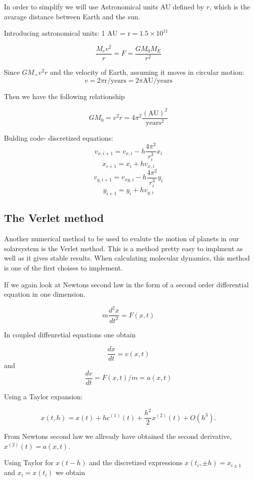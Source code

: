 \documentclass[../main.tex]{subfiles}
\begin{document}
In order to simplify we will use Astronomical units AU defined by $r$, which is the avarage distance between Earth and the sun.

Introducing astronomical units: 1 $\text{AU = r} = 1.5 \times 10^{11}$

\begin{equation}
  \frac{M_ev^2}{r} = F = \frac{GM_0M_E}{r^2}
\end{equation}

Since $GM_=  v^2r$ and the velocity of Earth, assuming it moves in circular motion: $$v = 2\pi \text{r/years}= 2\pi \text{AU/years}$$

Then we have the following relationship

$$GM_0 = v^2r = 4\pi^2 \frac{(\text{AU})^2}{\text{years}^2}$$

Bulding code- discretized equations:
$$v_{x,i+1} = v_{x,i} - h \frac{4\pi^2}{r_i^3}x_i$$
$$x_{i+1} = x_{i} + hv_{x,i}$$
$$v_{y,i+1} = v_{xy,i} - h \frac{4\pi^2}{r_i^3}y_i$$
$$y_{i+1} = y_{i} + hv_{y,i}$$

\subsection{The Verlet method}
Another numerical method to be used to evalute the motion of planets in our solarsystem is the Verlet method. This is a method pretty easy to implment as well as it gives stable results. When calculating molecular dynamics, this method is one of the first choises to implement.

If we again look at Newtons second law in the form of a second order differential equation in one dimension.

\begin{equation}
 m \frac{d^2x}{dt^2} = F(x,t)
\end{equation}

In coupled diffenretial equations one obtain

$$\frac{dx}{dt} = v(x,t)$$    and     $$\frac{dv}{dt} = F(x,t)/m = a(x,t)$$

Using a Taylor expansion:

\begin{equation}
 x(t,h) = x(t) + hc^{(1)}(t) + \frac{h^2}{2}x^{(2)}(t) + O(h^3).
\end{equation}

From Newtons second law we allready have obtained the second derivative, $x^{(2)}(t) = a(x,t)$.

Using Taylor for $x(t-h)$ and the discretized expressions $x(t_i,\pm h) = x_{i \pm 1}$ and $x_i = x(t_i)$ we obtain
\end{document}
